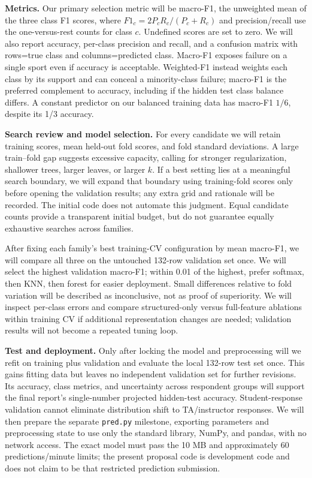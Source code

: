 \documentclass[12pt]{article}
\begin{document}
\textbf{Metrics.}
Our primary selection metric will be macro-F1, the unweighted mean of the three
class F1 scores, where $F1_c=2P_cR_c/(P_c+R_c)$ and precision/recall use the
one-versus-rest counts for class $c$. Undefined scores are set to zero. We will
also report accuracy, per-class precision and recall, and a confusion matrix
with rows=true class and columns=predicted class. Macro-F1 exposes failure on a
single sport even if accuracy is acceptable. Weighted-F1 instead weights each
class by its support and can conceal a minority-class failure; macro-F1 is the
preferred complement to accuracy, including if the hidden test class balance
differs. A constant predictor on our balanced training data has macro-F1 $1/6$,
despite its 1/3 accuracy.

\textbf{Search review and model selection.}
For every candidate we will retain training scores, mean held-out fold scores,
and fold standard deviations. A large train--fold gap suggests excessive capacity,
calling for stronger regularization, shallower trees, larger leaves, or larger
$k$. If a best setting lies at a meaningful search boundary, we will expand that
boundary using training-fold scores only before opening the validation results;
any extra grid and rationale will be recorded. The initial code does not automate
this judgment. Equal candidate counts provide a transparent initial budget, but
do not guarantee equally exhaustive searches across families.

After fixing each family's best training-CV configuration by mean macro-F1, we
will compare all three on the untouched 132-row validation set once. We will
select the highest validation macro-F1; within 0.01 of the highest, prefer softmax,
then KNN, then forest for easier deployment. Small differences relative to
fold variation will be described as inconclusive, not as proof of superiority.
We will inspect per-class errors and compare structured-only versus full-feature
ablations within training CV if additional representation changes are needed;
validation results will not become a repeated tuning loop.

\textbf{Test and deployment.}
Only after locking the model and preprocessing will we refit on training plus
validation and evaluate the local 132-row test set once. This gains fitting data
but leaves no independent validation set for further revisions. Its accuracy,
class metrics, and uncertainty across respondent groups will support the final
report's single-number projected hidden-test accuracy. Student-response validation
cannot eliminate distribution shift to TA/instructor responses. We will then
prepare the separate \texttt{pred.py} milestone, exporting parameters and
preprocessing state to use only the standard library, NumPy, and pandas, with no
network access. The exact model must pass the 10 MB and approximately 60
predictions/minute limits; the present proposal code is development code and
does not claim to be that restricted prediction submission.
\end{document}
